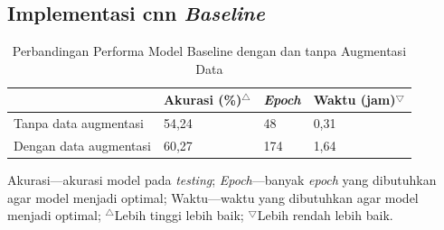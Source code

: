 \subsection{Implementasi \acrshort{cnn} \textit{Baseline}}
\begin{table}[t]
    \caption[Perbandingan Performa Model \textit{Baseline} dengan dan tanpa Augmentasi Data]{Perbandingan Performa Model Baseline dengan dan tanpa Augmentasi Data}
    \label{tab:eksperimenbaseline}
    \begin{tabular}{|L{5.4cm}|C{2.6cm}|C{1.5cm}|C{2.7cm}|}
        \hline
        & Akurasi (\%)$^\bigtriangleup$ & \textit{Epoch} & Waktu (jam)$^\bigtriangledown$ \\
        \hline\hline
        Tanpa data augmentasi & 54,24 & 48 & 0,31 \\
        \hline
        Dengan data augmentasi & 60,27 & 174 & 1,64 \\
        \hline
    \end{tabular}
    \footnotesize
    {\raggedright Akurasi---akurasi model pada \textit{testing}; \textit{Epoch}---banyak \textit{epoch} yang dibutuhkan agar model menjadi optimal; Waktu---waktu yang dibutuhkan agar model menjadi optimal; $^\bigtriangleup$Lebih tinggi lebih baik; $^\bigtriangledown$Lebih rendah lebih baik.}
\end{table}
